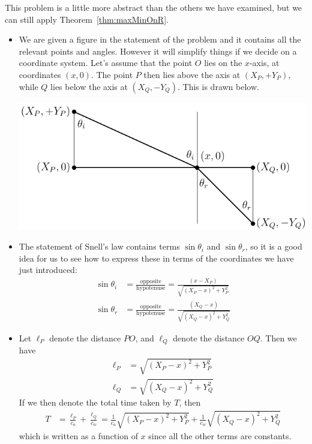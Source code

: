 \begin{eg}
\soln This problem is a little more abstract than the others we have examined,
but we can still apply Theorem~\ref{thm:maxMinOnR}.
\begin{itemize}
 \item We are given a figure in the statement of the problem and it contains
all the relevant points and angles. However it will simplify things if we
decide on a coordinate system. Let's assume that the point $O$ lies on the
$x$-axis, at coordinates $(x,0)$. The point $P$ then lies above the axis at
$(X_P,+Y_P)$, while $Q$ lies below the axis at $(X_Q,-Y_Q)$. This is drawn below.
\begin{efig}
\begin{center}
   \includegraphics{snellB}
\end{center}
\end{efig}



\item The statement of Snell's law contains terms $\sin \theta_i$ and $\sin
\theta_r$, so it is a good idea for us to see how to express these in terms of
the coordinates we have just introduced:
\begin{align*}
  \sin \theta_i &=  \frac{\text{opposite}}{\text{hypotenuse}}
  = \frac{(x-X_P)}{\sqrt{(X_P-x)^2 + Y_P^2}}\\
  \sin \theta_r &=  \frac{\text{opposite}}{\text{hypotenuse}}
  = \frac{(X_Q-x)}{\sqrt{(X_Q-x)^2 + Y_Q^2}}
\end{align*}

\item Let $\ell_P$ denote the distance $PO$, and $\ell_Q$ denote the distance
$OQ$. Then we have
\begin{align*}
  \ell_P &= \sqrt{(X_P-x)^2+Y_P^2} \\
  \ell_Q &= \sqrt{(X_Q-x)^2+Y_Q^2}
\end{align*}
If we then denote the total time taken by $T$, then
\begin{align*}
  T &= \frac{\ell_P}{c_a} + \frac{\ell_Q}{c_w}
  = \frac{1}{c_a}\sqrt{(X_P-x)^2+Y_P^2} + \frac{1}{c_w}\sqrt{(X_Q-x)^2+Y_Q^2}
\end{align*}
which is written as a function of $x$ since all the other terms are
constants.


\end{itemize}
\end{eg}
